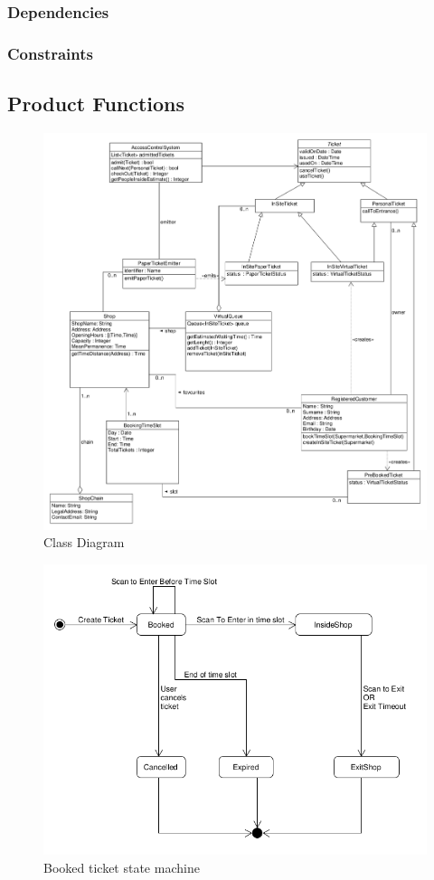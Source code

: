 \subsubsection{Dependencies}
\subsubsection{Constraints}

\subsection{Product Functions}    
    \begin{figure}
        \centering
        \includegraphics[width=\textwidth]{Images/UML_class_synthetic.png}
        \caption{\label{fig:Booked_Ticket_State}Class Diagram}
    \end{figure}
    \begin{figure}
    \centering
    \includegraphics[width=\textwidth]{Images/UML_booked_ticket.png}
    \caption{\label{fig:Booked_Ticket_State}Booked ticket state machine}
    \end{figure}
